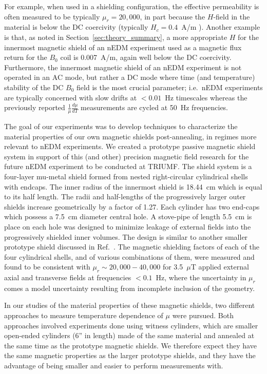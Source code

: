 \documentclass[review]{elsarticle}
\begin{document}
For example, when used in a shielding configuration, the effective
permeability is often measured to be typically $\mu_r=20,000$, in part
because the $H$-field in the material is below the DC coercivity
(typically $H_c=0.4$~A/m \cite{bib:kruppvdm}).  Another example is
that, as noted in Section~\ref{sec:theory_summary}, a more appropriate $H$ for
the innermost magnetic shield of an nEDM experiment used as a magnetic
flux return for the $B_0$ coil is 0.007~A/m, again well below the DC
coercivity.  Furthermore, the innermost magnetic shield of an nEDM
experiment is not operated in an AC mode, but rather a DC mode where
time (and temperature) stability of the DC $B_0$ field is the most
crucial parameter; i.e.~nEDM experiments are typically concerned with
slow drifts at $<0.01$~Hz timescales whereas the previously reported
$\frac{1}{\mu}\frac{d\mu}{dT}$ measurements are cycled at 50~Hz
frequencies.


The goal of our experiments was to develop techniques to characterize
the material properties of our own magnetic shields post-annealing, in
regimes more relevant to nEDM experiments.  We created a prototype
passive magnetic shield system in support of this (and other)
precision magnetic field research for the future nEDM experiment to be
conducted at TRIUMF.  The shield system is a four-layer mu-metal
shield formed from nested right-circular cylindrical shells with
endcaps.  The inner radius of the innermost shield is 18.44~cm which
is equal to its half length. The radii and half-lengths of the
progressively larger outer shields increase geometrically by a factor
of 1.27.  Each cylinder has two end-caps which possess a 7.5~cm
diameter central hole.  A stove-pipe of length 5.5~cm is place on each
hole was designed to minimize leakage of external fields into the
progressively shielded inner volumes.  The design is similar to
another smaller prototype shield discussed in
Ref.~\cite{bib:nmorpaper}.  The magnetic shielding factors of each of
the four cylindrical shells, and of various combinations of them, were
measured and found to be consistent with $\mu_r\sim 20,000-40,000$ for
3.5~$\mu$T applied external axial and transverse fields at frequencies
$<0.1$~Hz, where the uncertainty in $\mu_r$ comes a model uncertainty
resulting from incomplete inclusion of the geometry.


In our studies of the material properties of these magnetic shields,
two different approaches to measure temperature dependence of $\mu$
were pursued.  Both approaches involved experiments done using witness
cylinders, which are smaller open-ended cylinders (6'' in length) made
of the same material and annealed at the same time as the prototype
magnetic shields.  We therefore expect they have the same magnetic
properties as the larger prototype shields, and they have the
advantage of being smaller and easier to perform measurements with.
\end{document}
